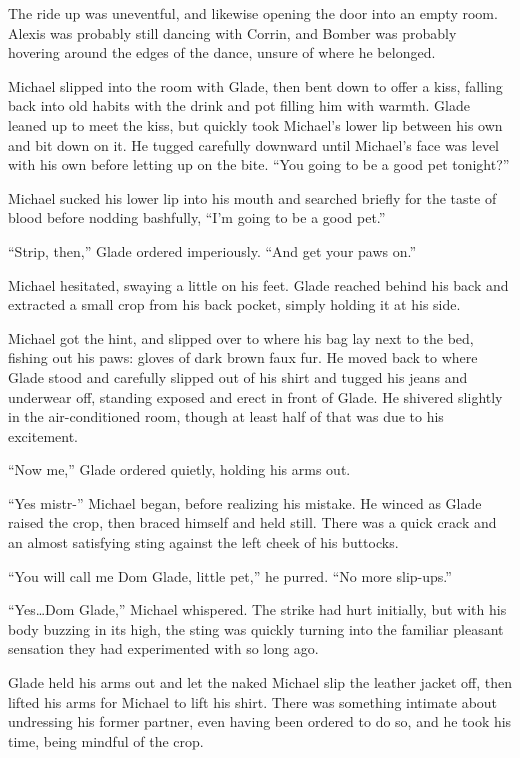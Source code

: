 \documentclass[12pt,letterpaper,oneside]{memoir}
\begin{document}
  The ride up was uneventful, and likewise opening the door into an empty room.  Alexis was probably still dancing with Corrin, and Bomber was probably hovering around the edges of the dance, unsure of where he belonged.

  Michael slipped into the room with Glade, then bent down to offer a kiss, falling back into old habits with the drink and pot filling him with warmth.  Glade leaned up to meet the kiss, but quickly took Michael's lower lip between his own and bit down on it.  He tugged carefully downward until Michael's face was level with his own before letting up on the bite.  ``You going to be a good pet tonight?''

  Michael sucked his lower lip into his mouth and searched briefly for the taste of blood before nodding bashfully, ``I'm going to be a good pet.''

  ``Strip, then,'' Glade ordered imperiously.  ``And get your paws on.''

  Michael hesitated, swaying a little on his feet.  Glade reached behind his back and extracted a small crop from his back pocket, simply holding it at his side.

  Michael got the hint, and slipped over to where his bag lay next to the bed, fishing out his paws: gloves of dark brown faux fur.  He moved back to where Glade stood and carefully slipped out of his shirt and tugged his jeans and underwear off, standing exposed and erect in front of Glade. He shivered slightly in the air-conditioned room, though at least half of that was due to his excitement.

  ``Now me,'' Glade ordered quietly, holding his arms out.

  ``Yes mistr-'' Michael began, before realizing his mistake.  He winced as Glade raised the crop, then braced himself and held still.  There was a quick crack and an almost satisfying sting against the left cheek of his buttocks.

  ``You will call me Dom Glade, little pet,'' he purred.  ``No more slip-ups.''

  ``Yes\ldots{}Dom Glade,'' Michael whispered.  The strike had hurt initially, but with his body buzzing in its high, the sting was quickly turning into the familiar pleasant sensation they had experimented with so long ago.

  Glade held his arms out and let the naked Michael slip the leather jacket off, then lifted his arms for Michael to lift his shirt.  There was something intimate about undressing his former partner, even having been ordered to do so, and he took his time, being mindful of the crop.
\end{document}

